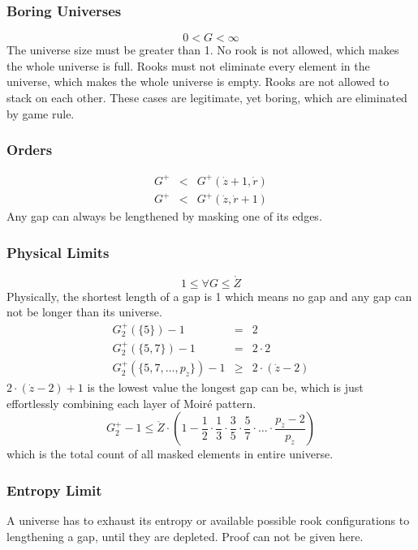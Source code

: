 \documentclass[twocolumn]{article}%
\theoremstyle{definition}
\theoremstyle{remark}
\begin{document}
\subsubsection*{Boring Universes}
\begin{equation}
0 < G < \infty
\end{equation}
The universe size must be greater than 1.
No rook is not allowed, which makes the whole universe is full.
Rooks must not eliminate every element in the universe, which makes the whole universe is empty. 
Rooks are not allowed to stack on each other. 
These cases are legitimate, yet boring, which are eliminated by game rule.
\subsubsection*{Orders}
\begin{eqnarray*}
	G^{+} &<& G^{+}(\dot{z}+1, \dot{r})\\
	G^{+} &<& G^{+}(\dot{z}, \dot{r}+1)
\end{eqnarray*}
Any gap can always be lengthened by masking one of its edges.
\subsubsection*{Physical Limits}
\begin{equation}
1 \le \forall G \le \mathring{Z}
\end{equation}
Physically, the shortest length of a gap is 1 which means no gap and any gap can not be longer than its universe.
\begin{eqnarray*}
	G_2^{+}(\{5\})-1	&=& 2 \\
	G_2^{+}(\{5,7\})-1	&=& 2\cdot2\\
	G_2^{+}(\{  5,7,\dots,p_{\dot{z}}\})-1	&\ge&	2 \cdot (\dot{z}-2) 
\end{eqnarray*}
$2 \cdot (\dot{z}-2)+1$ is the lowest value the longest gap can be, which is just effortlessly combining each layer of Moiré pattern.
\begin{equation*}
G_2^{+}-1\le\mathring{Z}\cdot(1-\frac{1}{2}\cdot\frac{1}{3}\cdot\frac{3}{5}\cdot\frac{5}{7}\cdot\dots\cdot\frac{p_{\dot{z}}-2}{p_{\dot{z}}})
\end{equation*}
which is the total count of all masked elements in entire universe.


\subsubsection*{Entropy Limit}
A universe has to exhaust its entropy or available possible rook configurations to lengthening a gap, until they are depleted. Proof can not be given here.
\end{document}
